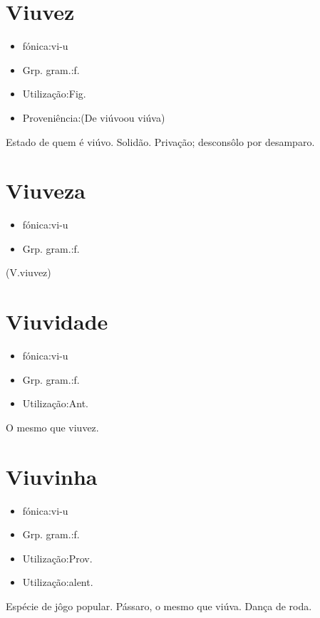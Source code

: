 \documentclass{article}
\begin{document}
\section{Viuvez}
\begin{itemize}
\item {fónica:vi-u}
\end{itemize}
\begin{itemize}
\item {Grp. gram.:f.}
\end{itemize}
\begin{itemize}
\item {Utilização:Fig.}
\end{itemize}
\begin{itemize}
\item {Proveniência:(De \textunderscore viúvo\textunderscore  ou \textunderscore viúva\textunderscore )}
\end{itemize}
Estado de quem é viúvo.
Solidão.
Privação; desconsôlo por desamparo.
\section{Viuveza}
\begin{itemize}
\item {fónica:vi-u}
\end{itemize}
\begin{itemize}
\item {Grp. gram.:f.}
\end{itemize}
(V.viuvez)
\section{Viuvidade}
\begin{itemize}
\item {fónica:vi-u}
\end{itemize}
\begin{itemize}
\item {Grp. gram.:f.}
\end{itemize}
\begin{itemize}
\item {Utilização:Ant.}
\end{itemize}
O mesmo que \textunderscore viuvez\textunderscore .
\section{Viuvinha}
\begin{itemize}
\item {fónica:vi-u}
\end{itemize}
\begin{itemize}
\item {Grp. gram.:f.}
\end{itemize}
\begin{itemize}
\item {Utilização:Prov.}
\end{itemize}
\begin{itemize}
\item {Utilização:alent.}
\end{itemize}
Espécie de jôgo popular.
Pássaro, o mesmo que \textunderscore viúva\textunderscore .
Dança de roda.
\end{document}
